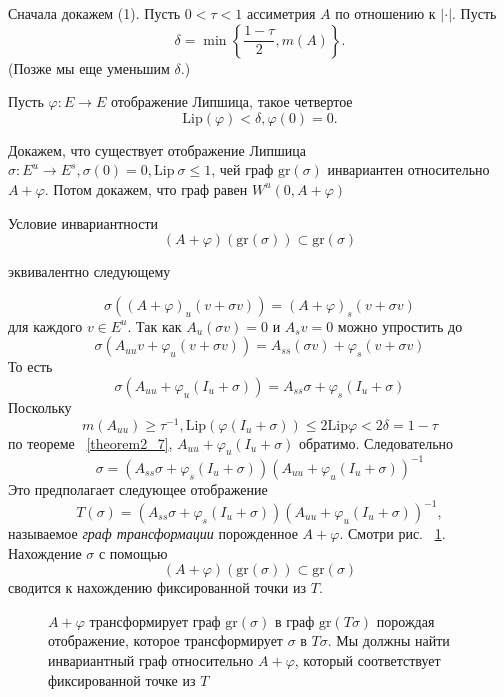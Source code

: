 \begin{demo}
Сначала докажем (1). Пусть $0 < \tau < 1$ ассиметрия $A$ по отношению к $|\cdot|$. Пусть 
$$
\delta = \min \left\{ \frac{1-\tau}{2}, m(A) \right\}.
$$
(Позже мы еще уменьшим $\delta$.)

Пусть $\varphi: E \rightarrow E$ отображение Липшица, такое четвертое
$$
\mathrm{Lip}(\varphi) < \delta, \varphi(0)=0.
$$

Докажем, что существует отображение Липшица $\sigma: E^u \rightarrow E^s, \sigma(0)=0, \mathrm{Lip} \ \sigma \leqslant 1$, чей граф $\mathrm{gr}(\sigma)$ инвариантен относительно $A+\varphi$. Потом докажем, что граф равен $W^u(0,A+ \varphi)$

Условие инвариантности 
$$
(A+\varphi)(\mathrm{gr}(\sigma)) \subset \mathrm{gr}(\sigma)
$$

эквивалентно следующему

$$
\sigma ((A+\varphi)_u(v+\sigma v)) = (A+\varphi)_s(v+\sigma v)
$$
для каждого $v \in E^u$. Так как $A_u(\sigma v)=0$ и $A_s v=0$ можно упростить до 
$$
\sigma (A_{uu}v+\varphi_u(v+\sigma v)) = A_{ss}(\sigma v)+\varphi_s(v + \sigma v)
$$
То есть 
$$
\sigma(A_{uu}+\varphi_u(I_u+\sigma)) = A_{ss}\sigma + \varphi_s(I_u+\sigma)
$$
Поскольку 
$$
m(A_{uu}) \geqslant \tau^{-1}, \mathrm{Lip}(\varphi(I_u+\sigma)) \leqslant 2 \mathrm{Lip} \varphi < 2\delta = 1-\tau
$$
по теореме ~\ref{theorem2_7}, $A_{uu}+\varphi_u(I_u + \sigma)$ обратимо. Следовательно
$$
\sigma = (A_{ss}\sigma+\varphi_s(I_u+\sigma))(A_{uu} + \varphi_u(I_u+\sigma))^{-1}
$$  
Это предполагает следующее отображение
$$
T(\sigma)=(A_{ss}\sigma + \varphi_s(I_u+\sigma))(A_{uu} + \varphi_u(I_u+\sigma))^{-1},
$$
называемое \textit{граф трансформации} порожденное $A+\varphi$. Смотри рис. ~\ref{picture2_10}. Нахождение $\sigma$ с помощью 
$$
(A+\varphi)(\mathrm{gr}(\sigma)) \subset \mathrm{gr}(\sigma)
$$
сводится к нахождению фиксированной точки из $T$.
\\
\begin{figure}[h]
\begin{center}
\begin{minipage}{.85\textwidth}
\begin{center}
\caption{$A + \varphi$ трансформирует граф $\mathrm{gr}(\sigma)$ в граф $\mathrm{gr}(T\sigma)$ порождая отображение, которое трансформирует $\sigma$ в $T\sigma$. Мы должны найти инвариантный граф относительно $A+\varphi$, который соответствует фиксированной точке из $T$ }
\label{picture2_10}
\end{center}
\end{minipage}
\end{center}
\end{figure}



\end{demo}
 


